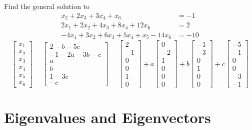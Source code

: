 \documentclass[12pt]{article}
\begin{document}
\begin{example} Find the general solution to $$ \begin{aligned} x_2 + 2x_3 + 3x_4 + x_6 &= -1 \\ 2x_1 + 2x_2 + 4x_3  + 8x_4  + 12x_6 &= 2 \\ -4x_1  + 3x_2 + 6x_3 + 5x_4 + x_5 - 14x_6 &= -10 \end{aligned} $$ $$\begin{bmatrix} x_1 \\ x_2 \\ x_3 \\ x_4 \\ x_5 \\ x_6 \end{bmatrix} = \begin{bmatrix} 2 - b - 5c \\ -1 - 2a - 3b - c \\ a \\ b \\ 1 - 3c \\ -c \end{bmatrix} = \begin{bmatrix} 2 \\ -1 \\ 0 \\ 0 \\ 1\\ 0 \end{bmatrix} + a\begin{bmatrix} 0 \\ -2 \\ 1 \\ 0 \\ 0 \\ 0 \end{bmatrix} + b\begin{bmatrix} -1 \\ -3 \\ 0 \\ 1 \\ 0 \\ 0 \end{bmatrix} + c\begin{bmatrix} -5 \\ -1 \\ 0 \\ 0 \\ -3 \\ -1 \end{bmatrix} $$ \end{example} 

\section{Eigenvalues and Eigenvectors} 
\end{document}
